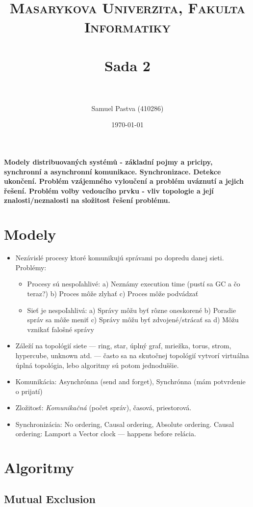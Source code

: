 \documentclass[paper=a4, fontsize=11pt]{scrartcl} %
\title{	
	\normalfont \normalsize 
	\textsc{Masarykova Univerzita, Fakulta Informatiky} \\ [25pt] %
	\horrule{0.5pt} \\[0.4cm] %
	\huge Sada 2 \\ %
	\horrule{2pt} \\[0.5cm] %
}
\author{Samuel Pastva (410286)} %
\date{\normalsize\today} %
\numberwithin{equation}{section} %
\numberwithin{figure}{section} %
\numberwithin{table}{section} %
\begin{document}
	
	\textbf{Modely distribuovaných systémů - základní pojmy a pricipy, synchronní a asynchronní komunikace. Synchronizace. Detekce ukončení.  Problém vzájemného vyloučení a problém uváznutí a jejich řešení.  Problém volby vedoucího prvku - vliv topologie a její znalosti/neznalosti na složitost řešení problému.}
	
	\section{Modely}
	
	\begin{itemize}
		\item Nezávislé procesy ktoré komunikujú správami po dopredu danej sieti. Problémy:
		
		\begin{itemize}
			\item Procesy sú nespoľahlivé: a) Neznámy execution time (pustí sa GC a čo teraz?) b) Proces môže zlyhať c) Proces môže podvádzať
			\item Sieť je nespoľahlivá: a) Správy môžu byť rôzne oneskorené b) Poradie správ sa môže meniť c) Správy môžu byť zdvojené/strácať sa d) Môžu vznikať falošné správy
		\end{itemize}
	
		\item Záleží na topológií siete — ring, star, úplný graf, mriežka, torus, strom, hypercube, unknown atd. — často sa na skutočnej topológií vytvorí virtuálna úplná topológia, lebo algoritmy sú potom jednoduššie.
		
		\item Komunikácia: Asynchrónna (send and forget), Synchrónna (mám potvrdenie o prijatí)
		
		\item Zložitosť: \emph{Komunikačná} (počet správ), časová, priestorová.
		
		\item Synchronizácia: No ordering, Causal ordering, Absolute ordering. Causal ordering: Lamport a Vector clock — happens before relácia. 
		
	\end{itemize}

	\section{Algoritmy}
	
	\subsection{Mutual Exclusion}
	
\end{document}
